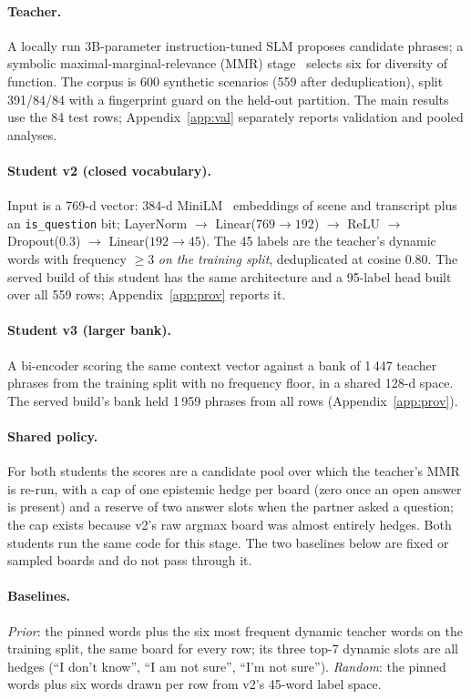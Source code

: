 \paragraph{Teacher.}
A locally run 3B-parameter instruction-tuned SLM proposes candidate
phrases; a symbolic maximal-marginal-relevance (MMR)
stage~\citep{mmr1998} selects six for diversity of function. The corpus is
600 synthetic scenarios (559 after deduplication), split 391/84/84 with a
fingerprint guard on the held-out partition. The main results use the 84
test rows; Appendix~\ref{app:val} separately reports validation and pooled
analyses.

\paragraph{Student v2 (closed vocabulary).}
Input is a 769-d vector: 384-d MiniLM~\citep{minilm} embeddings of scene
and transcript plus an \texttt{is\_question} bit;
LayerNorm $\to$ Linear($769{\to}192$) $\to$ ReLU $\to$ Dropout(0.3)
$\to$ Linear($192{\to}45$). The 45 labels are the teacher's dynamic words
with frequency $\ge 3$ \emph{on the training split}, deduplicated at cosine
0.80. The served build of this student has the same architecture and a
95-label head built over all 559 rows; Appendix~\ref{app:prov} reports it.

\paragraph{Student v3 (larger bank).}
A bi-encoder scoring the same context vector against a bank of 1\,447
teacher phrases from the training split with no frequency floor, in a
shared 128-d space. The served build's bank held 1\,959 phrases from all
rows (Appendix~\ref{app:prov}).

\paragraph{Shared policy.}
For both students the scores are a candidate pool over which the teacher's
MMR is re-run, with a cap of one epistemic hedge per board (zero once an
open answer is present) and a reserve of two answer slots when the partner
asked a question; the cap exists because v2's raw argmax board was almost
entirely hedges. Both students run the same code for this stage. The two
baselines below are fixed or sampled boards and do not pass through it.

\paragraph{Baselines.}
\emph{Prior}: the pinned words plus the six most frequent dynamic teacher
words on the training split, the same board for every row; its three
top-7 dynamic slots are all hedges (``I don't know'', ``I am not sure'',
``I'm not sure'').
\emph{Random}: the pinned words plus six words drawn per row from v2's
45-word label space.

